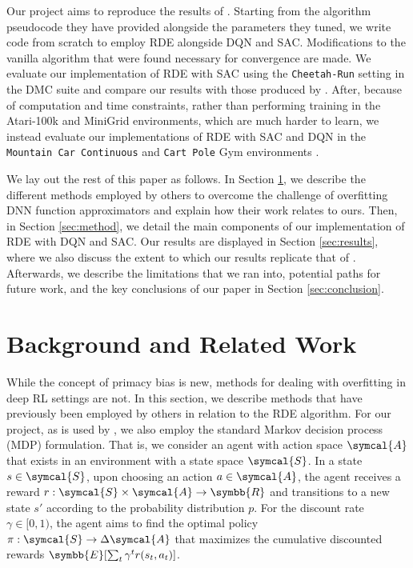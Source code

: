 \documentclass[base]{subfiles}
\begin{document}
Our project aims to reproduce the results of \cite{kim2023}.
Starting from the algorithm pseudocode they have provided alongside the parameters they tuned, we write code from scratch to employ RDE alongside DQN and SAC.
Modifications to the vanilla algorithm that were found necessary for convergence are made.
We evaluate our implementation of RDE with SAC using the \texttt{Cheetah-Run} setting in the DMC suite and compare our results with those produced by \cite{kim2023}.
After, because of computation and time constraints, rather than performing training in the Atari-100k and MiniGrid environments, which are much harder to learn, we instead evaluate our implementations of RDE with SAC and DQN in the \texttt{Mountain Car Continuous} and \texttt{Cart Pole} Gym environments \cite{gym}.

We lay out the rest of this paper as follows.
In Section \ref{sec:related_work}, we describe the different methods employed by others to overcome the challenge of overfitting DNN function approximators and explain how their work relates to ours.
Then, in Section \ref{sec:method}, we detail the main components of our implementation of RDE with DQN and SAC.
Our results are displayed in Section \ref{sec:results}, where we also discuss the extent to which our results replicate that of \cite{kim2023}.
Afterwards, we describe the limitations that we ran into, potential paths for future work, and the key conclusions of our paper in Section \ref{sec:conclusion}.

\section{Background and Related Work}
\label{sec:related_work}

While the concept of primacy bias is new, methods for dealing with overfitting in deep RL settings are not. In this section, we describe methods that have previously been employed by others in relation to the RDE algorithm. For our project, as is used by \cite{kim2023}, we also employ the standard Markov decision process (MDP) formulation.
That is, we consider an agent with action space $\symcal{A}$ that exists in an environment with a state space $\symcal{S}$.
In a state $s \in \symcal{S}$, upon choosing an action $a \in \symcal{A}$, the agent receives a reward $r: \symcal{S} \times \symcal{A} \rightarrow \symbb{R}$ and transitions to a new state $s'$ according to the probability distribution $p$.
For the discount rate $\gamma \in [0,1)$, the agent aims to find the optimal policy $\pi: \symcal{S} \rightarrow \Delta \symcal{A}$ that maximizes the cumulative discounted rewards $\symbb{E} [ \sum_{t} \gamma^t r(s_t, a_t) ]$.
\end{document}
